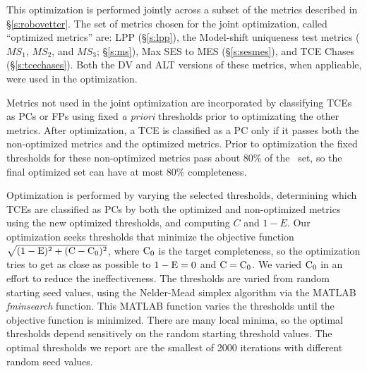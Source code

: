 
This optimization is performed jointly across a subset of the metrics described in \S\ref{s:robovetter}.  The set of metrics chosen for the joint optimization, called ``optimized metrics'' are: LPP (\S\ref{s:lpp}), the Model-shift uniqueness test metrics ($MS_{1}$, $MS_{2}$, and $MS_{3}$; \S\ref{s:ms}), Max SES to MES (\S\ref{s:sesmes}), and TCE Chases (\S\ref{s:tcechases}). Both the DV and ALT versions of these metrics, when applicable, were used in the optimization.


Metrics not used in the joint optimization are incorporated by classifying TCEs as PCs or FPs using fixed {\it a priori} thresholds prior to optimizating the other metrics.  After optimization, a TCE is classified as a PC only if it passes both the non-optimized metrics and the optimized metrics.  Prior to optimization the fixed thresholds for these non-optimized metrics pass about 80\% of the \injtce\ set, so the final optimized set can have at most 80\% completeness.

Optimization is performed by varying the selected thresholds, determining which TCEs are classified as PCs by both the optimized and non-optimized metrics using the new optimized thresholds, and computing $C$ and $1-E$.  Our optimization seeks thresholds that minimize the objective function $\sqrt{{(\rm 1-E})^2 + ({\rm C} - {\rm C}_0)^2}$, where ${\rm C}_0$ is the target completeness, so the optimization tries to get as close as possible to ${\rm 1-E} = 0$ and ${\rm C} = {\rm C}_0$.  We varied ${\rm C}_0$ in an effort to reduce the ineffectiveness. The thresholds are varied from random starting seed values, using the Nelder-Mead simplex algorithm via the \textsc{MATLAB} {\it fminsearch} function.  This \textsc{MATLAB} function varies the thresholds until the objective function is minimized.  There are many local minima, so the optimal thresholds depend sensitively on the random starting threshold values.  The optimal thresholds we report are the smallest of 2000 iterations with different random seed values.

